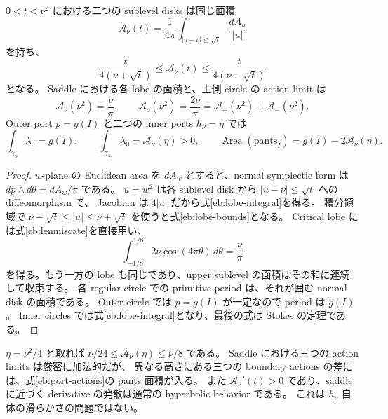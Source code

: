 \begin{proposition}\label{eb:lobe-action}
$0<t<\nu^2$ における二つの sublevel disks は同じ面積
\begin{equation}\label{eb:lobe-integral}
 \mathcal A_\nu(t)
   =\frac1{4\pi}\int_{|u-\nu|\le\sqrt t}\frac{dA_u}{|u|}
\end{equation}
を持ち、
\begin{equation}\label{eb:lobe-bounds}
 \frac{t}{4(\nu+\sqrt t)}
 \le\mathcal A_\nu(t)
 \le\frac{t}{4(\nu-\sqrt t)}
\end{equation}
となる。
Saddle における各 lobe の面積と、上側 circle の action limit は
\begin{equation}\label{eb:saddle-actions}
 \mathcal A_\nu(\nu^2)=\frac\nu\pi,
 \qquad \mathcal A_o(\nu^2)=\frac{2\nu}{\pi}
     =\mathcal A_+(\nu^2)+\mathcal A_-(\nu^2).
\end{equation}
Outer port $p=g(I)$ と二つの inner ports $h_\nu=\eta$ では
\begin{equation}\label{eb:port-actions}
 \int_{\gamma_o}\lambda_0=g(I),\qquad
 \int_{\gamma_\pm}\lambda_0=\mathcal A_\nu(\eta)>0,
 \qquad
 \operatorname{Area}(\text{pants}_I)=g(I)-2\mathcal A_\nu(\eta).
\end{equation}
\end{proposition}

\begin{proof}
$w$-plane の Euclidean area を $dA_w$ とすると、normal symplectic form は
$dp\wedge d\theta=dA_w/\pi$ である。
$u=w^2$ は各 sublevel disk から $|u-\nu|\le\sqrt t$ への diffeomorphism で、
Jacobian は $4|u|$ だから式\eqref{eb:lobe-integral}を得る。
積分領域で $\nu-\sqrt t\le|u|\le\nu+\sqrt t$ を使うと式\eqref{eb:lobe-bounds}となる。
Critical lobe には式\eqref{eb:lemniscate}を直接用い、
\[
 \int_{-1/8}^{1/8}2\nu\cos(4\pi\theta)\,d\theta=\frac\nu\pi
\]
を得る。もう一方の lobe も同じであり、upper sublevel の面積はその和に連続して収束する。
各 regular circle での primitive period は、それが囲む normal disk の面積である。
Outer circle では $p=g(I)$ が一定なので period は $g(I)$。
Inner circles では式\eqref{eb:lobe-integral}となり、最後の式は Stokes の定理である。
\end{proof}

$\eta=\nu^2/4$ と取れば $\nu/24\le\mathcal A_\nu(\eta)\le\nu/8$ である。
Saddle における三つの action limits は厳密に加法的だが、
異なる高さにある三つの boundary actions の差には、式\eqref{eb:port-actions}の pants 面積が入る。
また $\mathcal A_\nu'(t)>0$ であり、saddle に近づく derivative の発散は通常の hyperbolic behavior である。
これは $h_\nu$ 自体の滑らかさの問題ではない。

